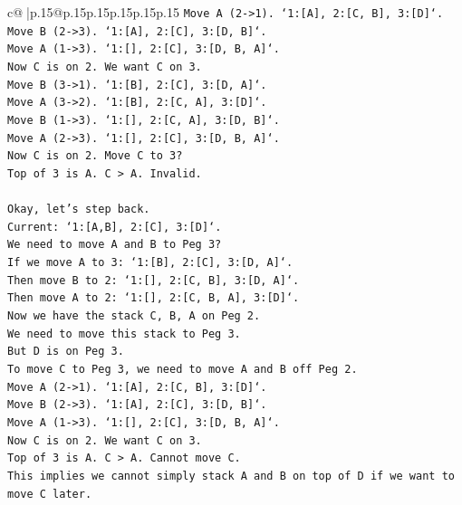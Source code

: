 \documentclass{article}
\begin{document}
{\begin{supertabular}{c@{$\;$}|p{.15\linewidth}@{}p{.15\linewidth}p{.15\linewidth}p{.15\linewidth}p{.15\linewidth}p{.15\linewidth}}
{{{\texttt{Move A (2{-}>1). `1:{[}A{]}, 2:{[}C, B{]}, 3:{[}D{]}`.} \\
\texttt{Move B (2{-}>3). `1:{[}A{]}, 2:{[}C{]}, 3:{[}D, B{]}`.} \\
\texttt{Move A (1{-}>3). `1:{[}{]}, 2:{[}C{]}, 3:{[}D, B, A{]}`.} \\
\texttt{Now C is on 2. We want C on 3.} \\
\texttt{Move B (3{-}>1). `1:{[}B{]}, 2:{[}C{]}, 3:{[}D, A{]}`.} \\
\texttt{Move A (3{-}>2). `1:{[}B{]}, 2:{[}C, A{]}, 3:{[}D{]}`.} \\
\texttt{Move B (1{-}>3). `1:{[}{]}, 2:{[}C, A{]}, 3:{[}D, B{]}`.} \\
\texttt{Move A (2{-}>3). `1:{[}{]}, 2:{[}C{]}, 3:{[}D, B, A{]}`.} \\
\texttt{Now C is on 2. Move C to 3?} \\
\texttt{Top of 3 is A. C > A. Invalid.} \\
\\ 
\texttt{Okay, let's step back.} \\
\texttt{Current: `1:{[}A,B{]}, 2:{[}C{]}, 3:{[}D{]}`.} \\
\texttt{We need to move A and B to Peg 3?} \\
\texttt{If we move A to 3: `1:{[}B{]}, 2:{[}C{]}, 3:{[}D, A{]}`.} \\
\texttt{Then move B to 2: `1:{[}{]}, 2:{[}C, B{]}, 3:{[}D, A{]}`.} \\
\texttt{Then move A to 2: `1:{[}{]}, 2:{[}C, B, A{]}, 3:{[}D{]}`.} \\
\texttt{Now we have the stack C, B, A on Peg 2.} \\
\texttt{We need to move this stack to Peg 3.} \\
\texttt{But D is on Peg 3.} \\
\texttt{To move C to Peg 3, we need to move A and B off Peg 2.} \\
\texttt{Move A (2{-}>1). `1:{[}A{]}, 2:{[}C, B{]}, 3:{[}D{]}`.} \\
\texttt{Move B (2{-}>3). `1:{[}A{]}, 2:{[}C{]}, 3:{[}D, B{]}`.} \\
\texttt{Move A (1{-}>3). `1:{[}{]}, 2:{[}C{]}, 3:{[}D, B, A{]}`.} \\
\texttt{Now C is on 2. We want C on 3.} \\
\texttt{Top of 3 is A. C > A. Cannot move C.} \\
\texttt{This implies we cannot simply stack A and B on top of D if we want to move C later.} \\
}}}
\end{supertabular}}
\end{document}
